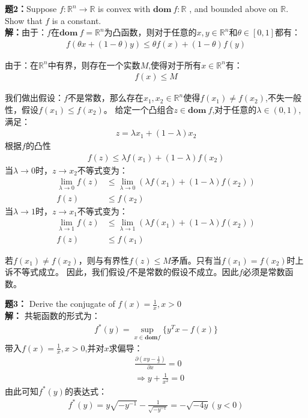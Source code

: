 \documentclass[12pt,a4paper]{article}
\begin{document}
\vspace{5pt}
\noindent
{\bf 题2：}Suppose \(f:\mathbb{R}^n \rightarrow \mathbb{R}\) is convex with  \(\mathbf{dom}~f:\mathbb{R}\) , and bounded above on \(\mathbb{R}\). Show that \(f\) is a constant.
\vspace{5pt}
\noindent \\
{\bf 解：}由于：\(f\)在\(\mathbf{dom}~f=\mathbb{R}^n\)为凸函数，则对于任意的\(x,y \in \mathbb{R}^n\)和\(\theta  \in [0,1]\)都有：
\begin{align*}
    f(\theta x+(1-\theta)y) \leq \theta f(x)+(1-\theta)f(y)
\end{align*}

由于：在\( \mathbb{R}^n\)中有界，则存在一个实数\(M\),使得对于所有\(x \in \mathbb{R}^n\)有：
\begin{align*}
    f(x)\le M
\end{align*}

我们做出假设：\(f\)不是常数，那么存在\(x_1,x_2 \in \mathbb{R}^n\)使得\(f(x_1)\neq f(x_2)\),不失一般性，假设\(f(x_1)\le f(x_2)\)。
给定一个凸组合\(z \in \mathbf{dom}~f\),对于任意的\(\lambda \in (0,1)\),满足：
\begin{align*}
    z=\lambda x_1+(1-\lambda)x_2
\end{align*}
根据\(f\)的凸性
\begin{align*}
    f(z)\le \lambda f(x_1)+(1-\lambda)f(x_2)
\end{align*}
当\(\lambda \rightarrow 0\)时，\(z \rightarrow x_2\)不等式变为：
\begin{align*}
    \lim_{\lambda \to 0}f(z)&\le \lim_{\lambda \to 0}(\lambda f(x_1)+(1-\lambda)f(x_2)) \\
    f(z)& \le f(x_2)
\end{align*} 
当\(\lambda \rightarrow 1\)时，\(z \rightarrow x_1\)不等式变为：
\begin{align*}
    \lim_{\lambda \to 1}f(z)&\le \lim_{\lambda \to 1}(\lambda f(x_1)+(1-\lambda)f(x_2)) \\
    f(z)& \le f(x_1)
\end{align*} 

若\(f(x_1)\neq f(x_2)\)，则与有界性\(f(z)\le M\)矛盾。只有当\(f(x_1)=f(x_2)\)时上诉不等式成立。
因此，我们假设\(f\)不是常数的假设不成立。因此\(f\)必须是常数函数。

\vspace{5pt}
\noindent
{\bf 题3：}
Derive the conjugate of \(f(x)=\frac{1}{x},x > 0 \)
\vspace{5pt}
\noindent \\
{\bf 解：}
共轭函数的形式为：
\begin{align*}
    f^*(y)=\sup _{x \in \mathbf{dom} f} \{y^Tx-f(x)\}
\end{align*}
带入\(f(x)=\frac{1}{x},x > 0 \),并对\(x\)求偏导：
\begin{align*}
    &\frac{\partial (xy- \frac{1}{x})}{\partial x}=0 \\
    &\Rightarrow  y+\frac{1}{x^2}=0
\end{align*}
由此可知\(f^*(y)\)的表达式：
\begin{align*}
    f^*(y)=y\sqrt{-y^{-1}} -\frac{1}{\sqrt{-y^{-1}}}=-\sqrt{-4y}(y<0)
\end{align*}


\vspace{10pt}
\noindent
\end{document}
